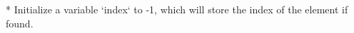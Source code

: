 \documentclass[preview]{standalone}
\begin{document}
* Initialize a variable `index` to -1, which will store the index of the element if found.\\
\end{document}
